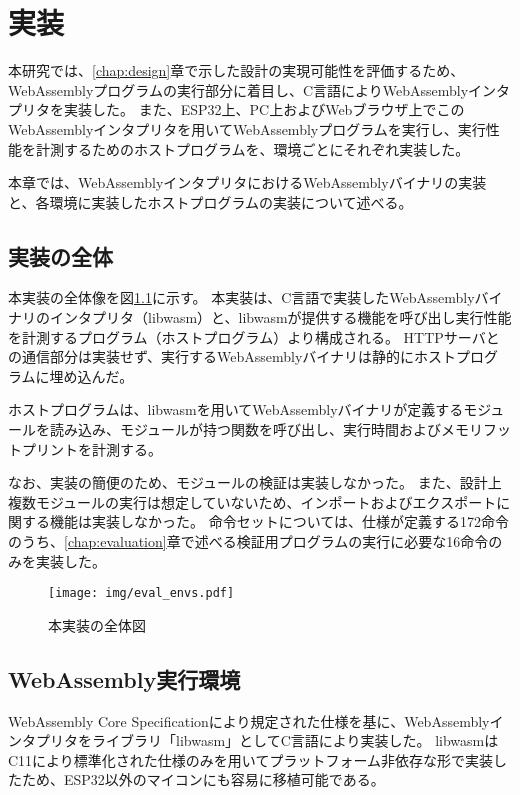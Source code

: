\chapter{実装}
\label{chap:implementation}

本研究では、\ref{chap:design}章で示した設計の実現可能性を評価するため、WebAssemblyプログラムの実行部分に着目し、C言語によりWebAssemblyインタプリタを実装した。
また、ESP32上、PC上およびWebブラウザ上でこのWebAssemblyインタプリタを用いてWebAssemblyプログラムを実行し、実行性能を計測するためのホストプログラムを、環境ごとにそれぞれ実装した。

本章では、WebAssemblyインタプリタにおけるWebAssemblyバイナリの実装と、各環境に実装したホストプログラムの実装について述べる。

\section{実装の全体}

本実装の全体像を図\ref{fig:eval_envs}に示す。
本実装は、C言語で実装したWebAssemblyバイナリのインタプリタ（libwasm）と、libwasmが提供する機能を呼び出し実行性能を計測するプログラム（ホストプログラム）より構成される。
HTTPサーバとの通信部分は実装せず、実行するWebAssemblyバイナリは静的にホストプログラムに埋め込んだ。

ホストプログラムは、libwasmを用いてWebAssemblyバイナリが定義するモジュールを読み込み、モジュールが持つ関数を呼び出し、実行時間およびメモリフットプリントを計測する。

なお、実装の簡便のため、モジュールの検証は実装しなかった。
また、設計上複数モジュールの実行は想定していないため、インポートおよびエクスポートに関する機能は実装しなかった。
命令セットについては、仕様が定義する172命令のうち、\ref{chap:evaluation}章で述べる検証用プログラムの実行に必要な16命令のみを実装した。

\begin{figure}[htbp]
  \caption{本実装の全体図}
  \label{fig:eval_envs}
  \begin{center}
    \texttt{[image: img/eval\_envs.pdf]}
  \end{center}
\end{figure}

\section{WebAssembly実行環境}

WebAssembly Core Specification\cite{wasm_spec}により規定された仕様を基に、WebAssemblyインタプリタをライブラリ「libwasm」としてC言語により実装した。
libwasmはC11により標準化された仕様のみを用いてプラットフォーム非依存な形で実装したため、ESP32以外のマイコンにも容易に移植可能である。

